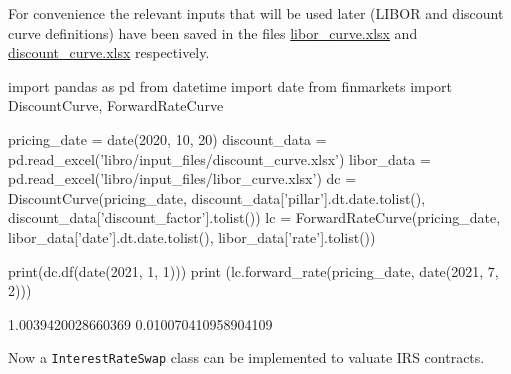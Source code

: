 For convenience the relevant inputs that will be used later (LIBOR and discount curve definitions) have been saved in the files  \href{https://github.com/matteosan1/finance_course/raw/develop/libro/input_files/libor_curve.xlsx}{libor\_curve.xlsx} and \href{https://github.com/matteosan1/finance_course/raw/develop/libro/input_files/discount_curve.xlsx}{discount\_curve.xlsx} respectively.

\begin{ipython}
import pandas as pd
from datetime import date
from finmarkets import DiscountCurve, ForwardRateCurve

pricing_date = date(2020, 10, 20)
discount_data = pd.read_excel('libro/input_files/discount_curve.xlsx')
libor_data = pd.read_excel('libro/input_files/libor_curve.xlsx')
dc = DiscountCurve(pricing_date,
discount_data['pillar'].dt.date.tolist(),
discount_data['discount_factor'].tolist())
lc = ForwardRateCurve(pricing_date, 
libor_data['date'].dt.date.tolist(),
libor_data['rate'].tolist())

print(dc.df(date(2021, 1, 1)))
print (lc.forward_rate(pricing_date, date(2021, 7, 2)))
\end{ipython}
\begin{ioutput}
1.0039420028660369
0.010070410958904109
\end{ioutput}

Now a \texttt{InterestRateSwap} class can be implemented to valuate IRS contracts.

